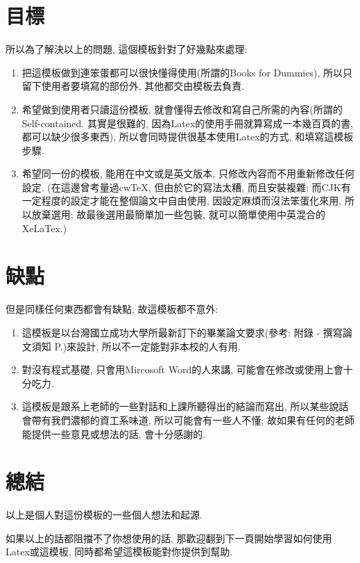 \section{目標}
所以為了解決以上的問題, 這個模板針對了好幾點來處理:

\begin{enumerate}

  \item 把這模板做到連笨蛋都可以很快懂得使用(所謂的Books for Dummies), 所以只留下使用者要填寫的部份外, 其他都交由模板去負責.

  \item 希望做到使用者只讀這份模板, 就會懂得去修改和寫自己所需的內容(所謂的Self-contained. 其實是很難的, 因為Latex的使用手冊就算寫成一本幾百頁的書, 都可以缺少很多東西), 所以會同時提供很基本使用Latex的方式, 和填寫這模板步驟.

  \item 希望同一份的模板, 能用在中文或是英文版本, 只修改內容而不用重新修改任何設定. (在這邊曾考量過cwTeX, 但由於它的寫法太糟, 而且安裝複雜\cite{web:latex:cwtex}; 而CJK有一定程度的設定才能在整個論文中自由使用, 因設定麻煩而沒法笨蛋化來用, 所以放棄選用; 故最後選用最簡單加一些包裝, 就可以簡單使用中英混合的XeLaTex.)

\end{enumerate}

\section{缺點}
但是同樣任何東西都會有缺點, 故這模板都不意外:

\begin{enumerate}

  \item 這模板是以台灣國立成功大學所最新訂下的畢業論文要求(參考: 附錄 - 撰寫論文須知 P.\pageref{appendix:thesis-spec})來設計, 所以不一定能對非本校的人有用.

  \item 對沒有程式基礎, 只會用Mircosoft Word的人來講, 可能會在修改或使用上會十分吃力.

  \item 這模板是跟系上老師的一些對話和上課所聽得出的結論而寫出, 所以某些說話會帶有我們濃郁的資工系味道, 所以可能會有一些人不懂; 故如果有任何的老師能提供一些意見或想法的話, 會十分感謝的.

\end{enumerate}

\section{總結}

以上是個人對這份模板的一些個人想法和起源.

如果以上的話都阻擋不了你想使用的話, 那歡迎翻到下一頁開始學習如何使用Latex或這模板, 同時都希望這模板能對你提供到幫助.

\clearpage

